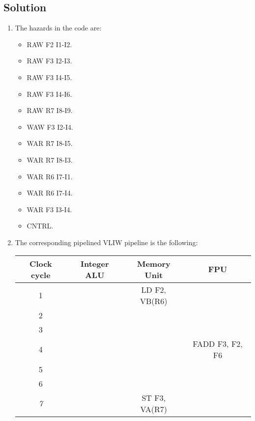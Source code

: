 \subsection*{Solution}
\begin{enumerate}
    \item The hazards in the code are: 
        \begin{itemize}
            \item RAW F2 I1-I2.
            \item RAW F3 I2-I3.
            \item RAW F3 I4-I5.
            \item RAW F3 I4-I6.
            \item RAW R7 I8-I9.
            \item WAW F3 I2-I4.
            \item WAR R7 I8-I5.
            \item WAR R7 I8-I3.
            \item WAR R6 I7-I1.
            \item WAR R6 I7-I4.
            \item WAR F3 I3-I4.
            \item CNTRL.
        \end{itemize}
    \item The corresponding pipelined VLIW pipeline is the following: 
        \begin{table}[H]
            \centering
            \begin{tabular}{c|ccc}
            \textbf{Clock cycle} & \textbf{Integer ALU} & \textbf{Memory Unit} & \textbf{FPU}    \\ \hline
            1                    &                      & LD F2, VB(R6)        &                 \\
            2                    &                      &                      &                 \\
            3                    &                      &                      &                 \\
            4                    &                      &                      & FADD F3, F2, F6 \\
            5                    &                      &                      &                 \\
            6                    &                      &                      &                 \\
            \textit{7}           &                      & ST F3, VA(R7)        &                 \\

\end{tabular}
\end{table}
\end{enumerate}
